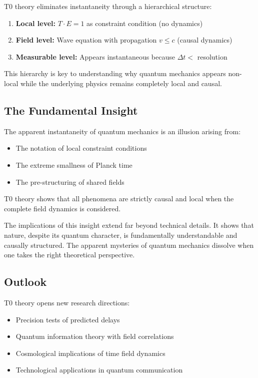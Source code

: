 \documentclass[12pt,a4paper]{article}
\begin{document}
	T0 theory eliminates instantaneity through a hierarchical structure:
	
	\begin{enumerate}
		\item \textbf{Local level:} $T \cdot E = 1$ as constraint condition (no dynamics)
		\item \textbf{Field level:} Wave equation with propagation $v \leq c$ (causal dynamics)
		\item \textbf{Measurable level:} Appears instantaneous because $\Delta t < $ resolution
	\end{enumerate}
	
	This hierarchy is key to understanding why quantum mechanics appears non-local while the underlying physics remains completely local and causal.
	
	\subsection{The Fundamental Insight}
	
	\begin{tcolorbox}[colback=t0yellow!10!white, colframe=t0yellow!75!black, title=Core Message]
		The apparent instantaneity of quantum mechanics is an illusion arising from:
		\begin{itemize}
			\item The notation of local constraint conditions
			\item The extreme smallness of Planck time
			\item The pre-structuring of shared fields
		\end{itemize}
		T0 theory shows that all phenomena are strictly causal and local when the complete field dynamics is considered.
	\end{tcolorbox}
	
	The implications of this insight extend far beyond technical details. It shows that nature, despite its quantum character, is fundamentally understandable and causally structured. The apparent mysteries of quantum mechanics dissolve when one takes the right theoretical perspective.
	
	\subsection{Outlook}
	
	T0 theory opens new research directions:
	\begin{itemize}
		\item Precision tests of predicted delays
		\item Quantum information theory with field correlations
		\item Cosmological implications of time field dynamics
		\item Technological applications in quantum communication
	\end{itemize}
	
\end{document}
